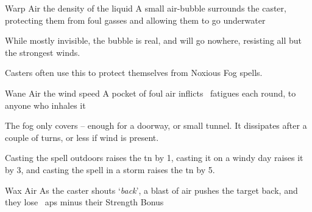   {}%
  {Warp}%
  {Air}%
  {the density of the liquid}%
  {A small air-bubble surrounds the caster, protecting them from foul gasses and allowing them to go underwater}%
  {While mostly invisible, the bubble is real, and will go nowhere, resisting all but the strongest winds.

    Casters often use this to protect themselves from Noxious Fog spells.}

  {}%
  {Wane}%
  {Air}%
  {the wind speed}%
  {A pocket of foul air inflicts ~\glspl{fatigue} each round, to anyone who inhales it}%
  {

    The fog only covers  -- enough for a doorway, or small tunnel.
    It dissipates after a couple of turns, or less if wind is present.

    Casting the spell outdoors raises the \gls{tn} by 1, casting it on a windy day raises it by 3, and casting the spell in a storm raises the \gls{tn} by 5.
  }

  {}%
  {Wax}%
  {Air}%
  {}%
  {As the caster shouts `\textit{back}', a blast of air pushes the target back, and they lose ~\glspl{ap} minus their Strength Bonus}%
  {}

